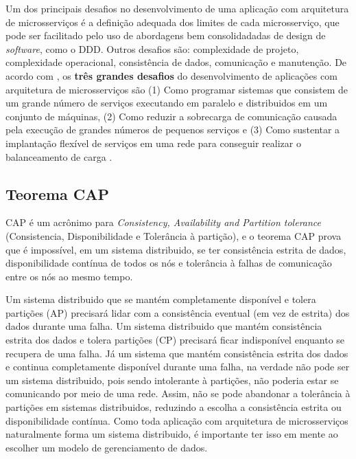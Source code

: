 Um dos principais desafios no desenvolvimento de uma aplicação com arquitetura de microsserviços é a definição adequada dos limites de cada microsserviço, que pode ser facilitado pelo uso de abordagens bem consolidadadas de design de \emph{software}, como o DDD. Outros desafios são: complexidade de projeto, complexidade operacional, consistência de dados, comunicação e manutenção. De acordo com , os \textbf{três grandes desafios} do desenvolvimento de aplicações com arquitetura de microsserviços são (1) Como programar sistemas que consistem de um grande número de serviços executando em paralelo e distribuidos em um conjunto de máquinas, (2) Como reduzir a sobrecarga de comunicação causada pela execução de grandes números de pequenos serviços e (3) Como sustentar a implantação flexível de serviços em uma rede para conseguir realizar o balanceamento de carga \cite{martin-fowler-monolith-first}.

\subsection{Teorema CAP}
CAP é um acrônimo para \emph{Consistency, Availability and Partition tolerance} (Consistencia, Disponibilidade e Tolerância à partição), e o teorema CAP prova que é impossível, em um sistema distribuido, se ter consistência estrita de dados, disponibilidade contínua de todos os nós e tolerância à falhas de comunicação entre os nós ao mesmo tempo.

Um sistema distribuido que se mantém completamente disponível e tolera partições (AP) precisará lidar com a consistência eventual (em vez de estrita) dos dados durante uma falha. Um sistema distribuido que mantém consistência estrita dos dados e tolera partições (CP) precisará ficar indisponível enquanto se recupera de uma falha. Já um sistema que mantém consistência estrita dos dados e continua completamente disponível durante uma falha, na verdade não pode ser um sistema distribuido, pois sendo intolerante à partições, não poderia estar se comunicando por meio de uma rede. Assim, não se pode abandonar a tolerância à partições em sistemas distribuidos, reduzindo a escolha a consistência estrita ou disponibilidade contínua. Como toda aplicação com arquitetura de microsserviços naturalmente forma um sistema distribuido, é importante ter isso em mente ao escolher um modelo de gerenciamento de dados. \cite{teorema-cap-ibm,livro-building-microservices}


